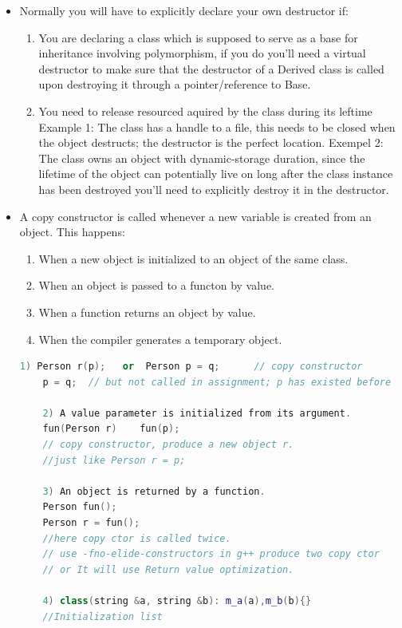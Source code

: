 \documentclass[a4paper,12pt,twoside]{book}
\begin{document}
\begin{itemize}
	\item Normally you will have to explicitly declare your own destructor if:
	\begin{enumerate}
		\item You are declaring a class which is supposed to serve as a base for inheritance involving polymorphism, if you do you'll need a virtual destructor to make sure that the destructor of a Derived class is called upon destroying it through a pointer/reference to Base.
		\item You need to release resourced aquired by the class during its leftime
		Example 1: The class has a handle to a file, this needs to be closed when the object destructs; the destructor is the perfect location.
		Exempel 2: The class owns an object with dynamic-storage duration, since the lifetime of the object can potentially live on long after the class instance has been destroyed you'll need to explicitly destroy it in the destructor.
	\end{enumerate}
	
	
	\item A copy constructor is called whenever a new variable is created from an object. This happens:
	
	\begin{enumerate}
		\item When a new object is initialized to an object of the same class.
		\item When an object is passed to a functon by value.
		\item When a function returns an object by value.
		\item When the compiler generates a temporary object.
	\end{enumerate}
	
	\begin{lstlisting}[frame=single, language=c++]
	1) Person r(p);   or  Person p = q;      // copy constructor
	p = q;  // but not called in assignment; p has existed before
	
	2) A value parameter is initialized from its argument.
	fun(Person r)    fun(p);
	// copy constructor, produce a new object r.
	//just like Person r = p;
	
	3) An object is returned by a function.
	Person fun();
	Person r = fun();
	//here copy ctor is called twice.
	// use -fno-elide-constructors in g++ produce two copy ctor
	// or It will use Return value optimization.
	
	4) class(string &a, string &b): m_a(a),m_b(b){}
	//Initialization list
	\end{lstlisting}
	

\end{itemize}
\end{document}
